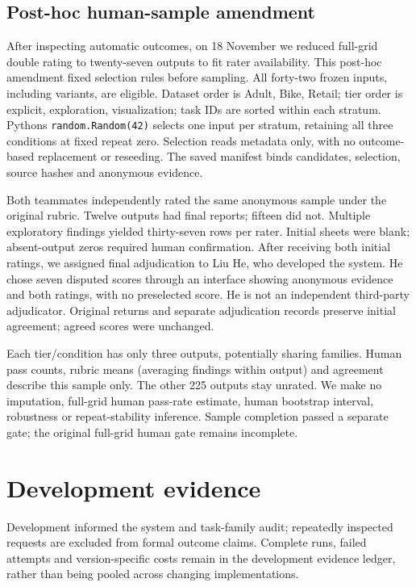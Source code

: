 \subsection{Post-hoc human-sample amendment}\label{post-hoc-human-sample-amendment}

After inspecting automatic outcomes, on 18 November we reduced full-grid double rating to twenty-seven outputs to fit rater availability. This post-hoc amendment fixed selection rules before sampling. All forty-two frozen inputs, including variants, are eligible. Dataset order is Adult, Bike, Retail; tier order is explicit, exploration, visualization; task IDs are sorted within each stratum. Python\textquotesingle s \texttt{random.Random(42)} selects one input per stratum, retaining all three conditions at fixed repeat zero. Selection reads metadata only, with no outcome-based replacement or reseeding. The saved manifest binds candidates, selection, source hashes and anonymous evidence.

Both teammates independently rated the same anonymous sample under the original rubric. Twelve outputs had final reports; fifteen did not. Multiple exploratory findings yielded thirty-seven rows per rater. Initial sheets were blank; absent-output zeros required human confirmation. After receiving both initial ratings, we assigned final adjudication to Liu He, who developed the system. He chose seven disputed scores through an interface showing anonymous evidence and both ratings, with no preselected score. He is not an independent third-party adjudicator. Original returns and separate adjudication records preserve initial agreement; agreed scores were unchanged.

Each tier/condition has only three outputs, potentially sharing families. Human pass counts, rubric means (averaging findings within output) and agreement describe this sample only. The other 225 outputs stay unrated. We make no imputation, full-grid human pass-rate estimate, human bootstrap interval, robustness or repeat-stability inference. Sample completion passed a separate gate; the original full-grid human gate remains incomplete.

\section{Development evidence}\label{development-evidence}

Development informed the system and task-family audit; repeatedly inspected requests are excluded from formal outcome claims. Complete runs, failed attempts and version-specific costs remain in the development evidence ledger, rather than being pooled across changing implementations.

